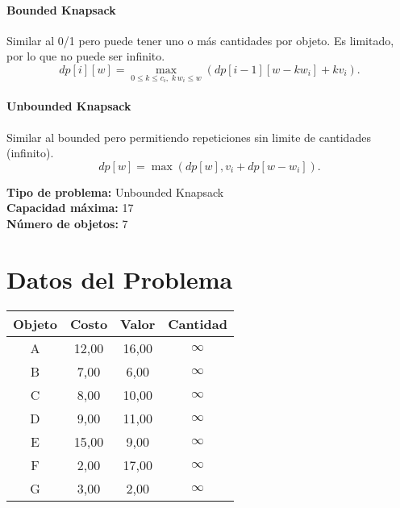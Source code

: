\documentclass{article}
\begin{document}
\paragraph{Bounded Knapsack} Similar al 0/1 pero puede tener uno o más cantidades por objeto. Es limitado, por lo que no puede ser infinito.
\[
dp[i][w] = 
\max_{0 \leq k \leq c_i,\; k\,w_i \leq w} \left( dp[i-1][w - k w_i] + k v_i \right).
\]

\paragraph{Unbounded Knapsack} Similar al bounded pero permitiendo repeticiones sin limite de cantidades (infinito).
\[
dp[w] = \max ( dp[w], v_i + dp[w - w_i] ).
\]

\thispagestyle{empty}
\newpage
\textbf{Tipo de problema:} Unbounded Knapsack\\
\textbf{Capacidad máxima:} 17\\
\textbf{Número de objetos:} 7\\

\section*{Datos del Problema}
\begin{tabular}{|c|c|c|c|}
\hline
Objeto & Costo & Valor & Cantidad \\
\hline
A & 12,00 & 16,00 & $\infty$ \\
B & 7,00 & 6,00 & $\infty$ \\
C & 8,00 & 10,00 & $\infty$ \\
D & 9,00 & 11,00 & $\infty$ \\
E & 15,00 & 9,00 & $\infty$ \\
F & 2,00 & 17,00 & $\infty$ \\
G & 3,00 & 2,00 & $\infty$ \\
\hline
\end{tabular}
\end{document}

